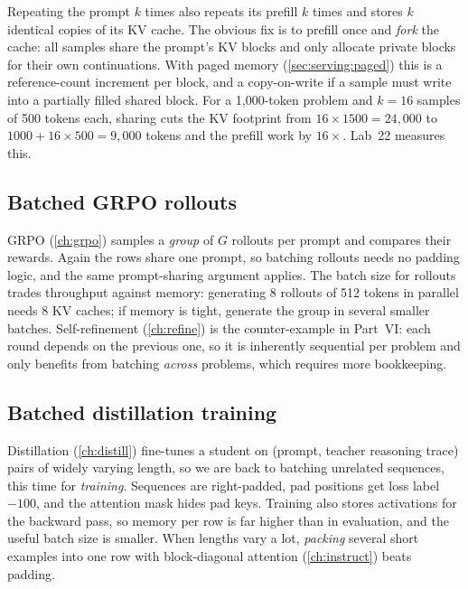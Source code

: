 \begin{systemslens}
Repeating the prompt $k$ times also repeats its prefill $k$ times and stores $k$ identical copies of
its KV cache. The obvious fix is to prefill once and \emph{fork} the cache: all samples share the
prompt's KV blocks and only allocate private blocks for their own continuations. With paged memory
(\cref{sec:serving:paged}) this is a reference-count increment per block, and a copy-on-write if a
sample must write into a partially filled shared block. For a 1,000-token problem and $k=16$
samples of 500 tokens each, sharing cuts the KV footprint from $16\times1500=24{,}000$ to
$1000+16\times500=9{,}000$ tokens and the prefill work by $16\times$. Lab~22 measures this.
\end{systemslens}

\subsection{Batched GRPO rollouts}
GRPO (\cref{ch:grpo}) samples a \emph{group} of $G$ rollouts per prompt and compares their rewards.
Again the rows share one prompt, so batching rollouts needs no padding logic, and the same
prompt-sharing argument applies. The batch size for rollouts trades throughput against memory:
generating 8 rollouts of 512 tokens in parallel needs 8 KV caches; if memory is tight, generate the
group in several smaller batches. Self-refinement (\cref{ch:refine}) is the counter-example in Part~VI:
each round depends on the previous one, so it is inherently sequential per problem and only benefits
from batching \emph{across} problems, which requires more bookkeeping.

\subsection{Batched distillation training}
Distillation (\cref{ch:distill}) fine-tunes a student on (prompt, teacher reasoning trace) pairs of
widely varying length, so we are back to batching unrelated sequences, this time for \emph{training}.
Sequences are right-padded, pad positions get loss label $-100$, and the attention mask hides pad keys.
Training also stores activations for the backward pass, so memory per row is far higher than in
evaluation, and the useful batch size is smaller. When lengths vary a lot, \emph{packing} several
short examples into one row with block-diagonal attention (\cref{ch:instruct}) beats padding.

